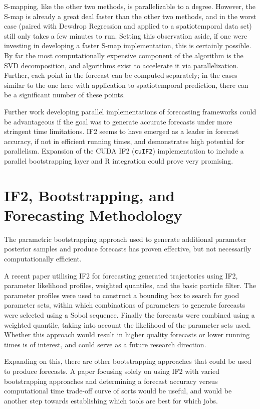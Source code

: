 	S-mapping, like the other two methods, is parallelizable to a degree. However, the S-map is already a great deal faster than the other two methods, and in the worst case (paired with Dewdrop Regression and applied to a spatiotemporal data set) still only takes a few minutes to run. Setting this observation aside, if one were investing in developing a faster S-map implementation, this is certainly possible. By far the most computationally expensive component of the algorithm is the SVD decomposition, and algorithms exist to accelerate it via parallelization. Further, each point in the forecast can be computed separately; in the cases similar to the one here with application to spatiotemporal prediction, there can be a significant number of these points.

	Further work developing parallel implementations of forecasting frameworks could be advantageous if the goal was to generate accurate forecasts under more stringent time limitations. IF2 seems to have emerged as a leader in forecast accuracy, if not in efficient running times, and demonstrates high potential for parallelism. Expansion of the CUDA IF2 (\texttt{cuIF2}) implementation to include a parallel bootstrapping layer and R integration could prove very promising.


\section{IF2, Bootstrapping, and Forecasting Methodology}

	The parametric bootstrapping approach used to generate additional parameter posterior samples and produce forecasts has proven effective, but not necessarily computationally efficient.

	A recent paper utilising IF2 for forecasting \cite{King2015} generated trajectories using IF2, parameter likelihood profiles, weighted quantiles, and the basic particle filter. The parameter profiles were used to construct a bounding box to search for good parameter sets, within which combinations of parameters to generate forecasts were selected using a Sobol sequence. Finally the forecasts were combined using a weighted quantile, taking into account the likelihood of the parameter sets used. Whether this approach would result in higher quality forecasts or lower running times is of interest, and could serve as a future research direction. 

	Expanding on this, there are other bootstrapping approaches that could be used to produce forecasts. A paper focusing solely on using IF2 with varied bootstrapping approaches and determining a forecast accuracy versus computational time trade-off curve of sorts would be useful, and would be another step towards establishing which tools are best for which jobs.


